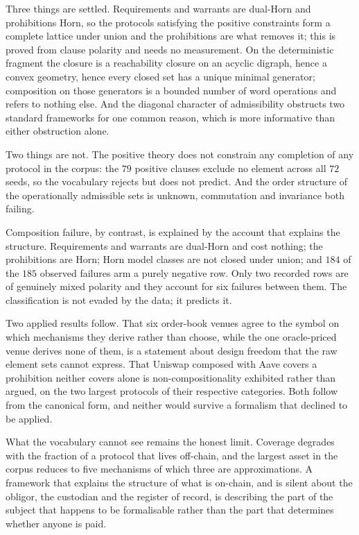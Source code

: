 \documentclass[11pt,reqno]{amsart}
\theoremstyle{plain}
\theoremstyle{definition}
\theoremstyle{remark}
\begin{document}
Three things are settled. Requirements and warrants are dual-Horn and
prohibitions Horn, so the protocols satisfying the positive constraints form a
complete lattice under union and the prohibitions are what removes it; this is
proved from clause polarity and needs no measurement. On the deterministic
fragment the closure is a reachability closure on an acyclic digraph, hence a
convex geometry, hence every closed set has a unique minimal generator; composition on those generators is a bounded number of word
operations and refers to nothing else. And the diagonal
character of admissibility obstructs two standard frameworks for one common
reason, which is more informative than either obstruction alone.

Two things are not. The positive theory does not constrain any completion of any
protocol in the corpus: the $79$ positive clauses exclude no element across all
$72$ seeds, so the vocabulary rejects but does not predict. And the order
structure of the operationally admissible sets is unknown, commutation and
invariance both failing.

Composition failure, by contrast, is explained by the account that explains the
structure. Requirements and warrants are dual-Horn and cost nothing; the
prohibitions are Horn; Horn model classes are not closed under union; and $184$
of the $185$ observed failures arm a purely negative row. Only two recorded
rows are of genuinely mixed polarity and they account for six failures between
them. The classification is not evaded by the data; it predicts it.

Two applied results follow. That six order-book venues agree to the symbol on which mechanisms they derive
rather than choose, while the one oracle-priced venue derives none of them, is a
statement about design freedom that the raw element sets cannot express. That
Uniswap composed with Aave covers a prohibition neither covers alone is
non-compositionality exhibited rather than argued, on the two largest protocols
of their respective categories. Both follow from the canonical form, and neither
would survive a formalism that declined to be applied.

What the vocabulary cannot see remains the honest limit. Coverage degrades with the fraction of a protocol that lives off-chain, and the
largest asset in the corpus reduces to five mechanisms of which three are
approximations. A framework
that explains the structure of what is on-chain, and is silent about the obligor,
the custodian and the register of record, is describing the part of the subject
that happens to be formalisable rather than the part that determines whether
anyone is paid.
\end{document}
